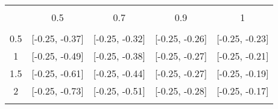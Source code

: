 
\begin{table}[!htbp] \centering 
  \caption{} 
  \label{} 
\begin{tabular}{@{\extracolsep{5pt}} ccccc} 
\\[-1.8ex]\hline 
\hline \\[-1.8ex] 
 & 0.5 & 0.7 & 0.9 & 1 \\ 
\hline \\[-1.8ex] 
0.5 & [-0.25, -0.37] & [-0.25, -0.32] & [-0.25, -0.26] & [-0.25, -0.23] \\ 
1 & [-0.25, -0.49] & [-0.25, -0.38] & [-0.25, -0.27] & [-0.25, -0.21] \\ 
1.5 & [-0.25, -0.61] & [-0.25, -0.44] & [-0.25, -0.27] & [-0.25, -0.19] \\ 
2 & [-0.25, -0.73] & [-0.25, -0.51] & [-0.25, -0.28] & [-0.25, -0.17] \\ 
\hline \\[-1.8ex] 
\end{tabular} 
\end{table} 
